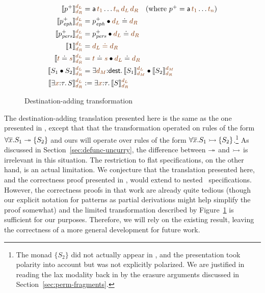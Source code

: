 \begin{figure}
\begin{align*}
\llbracket p^+ \rrbracket^{\lf{d_L}}_{\lf{d_R}} & = 
 {\sf a}\,\lf{t_1}\ldots \lf{t_n}\,\lf{d_L}\,\lf{d_R} ~~~ \mbox{(where $p^+ = {\sf a}\,\lf{t_1}\ldots \lf{t_n}$)}
\\
\llbracket p^+_\meph \rrbracket^{\lf{d_L}}_{\lf{d_R}} & = p^+_\meph \fuse \lf{d_L} \doteq \lf{d_R}
\\
\llbracket p^+_\mpers \rrbracket^{\lf{d_L}}_{\lf{d_R}} & = p^+_\mpers \fuse \lf{d_L} \doteq \lf{d_R}
\\
\llbracket \one \rrbracket^{\lf{d_L}}_{\lf{d_R}} & = \lf{d_L \doteq d_R}
\\
\llbracket \lf t \doteq \lf s \rrbracket^{\lf{d_L}}_{\lf{d_R}} & = \lf{t} \doteq \lf{s} \fuse \lf{d_L} \doteq \lf{d_R}
\\
\llbracket S_1 \fuse S_2 \rrbracket^{\lf{d_L}}_{\lf{d_R}} & = 
 \exists \lf{d_M}{:}{\sf dest}.\, 
   \llbracket S_1 \rrbracket^{\lf{d_L}}_{\lf{d_M}}
   \fuse
   \llbracket S_2 \rrbracket^{\lf{d_M}}_{\lf{d_R}}
\\
\llbracket \exists \lf{x}{:}\tau.\,S \rrbracket^{\lf{d_L}}_{\lf{d_R}} & := 
 \exists \lf{x}{:}\tau.\, \llbracket S \rrbracket^{\lf{d_L}}_{\lf{d_R}}
\end{align*}
\caption{Destination-adding transformation}
\label{fig:destadd-pos}
\end{figure}


The destination-adding translation presented here is the same as the
one presented in \cite{simmons11logical}, except that that the
transformation operated on rules of the form $\forall
\overline{x}. S_1 \twoheadrightarrow \{ S_2 \}$ and ours will operate over rules
of the form $\forall \overline{x}. S_1 \rightarrowtail \{ S_2 \}$.\footnote{The
  monad $\{ S_2 \}$ did not actually appear in
  \cite{simmons11logical}, and the presentation took polarity into
  account but was not explicitly polarized. We are justified in
  reading the lax modality back in by the erasure arguments discussed
  in Section~\ref{sec:perm-fragments}.} As discussed in
Section~\ref{sec:defunc-uncurry}, the difference between $\twoheadrightarrow$ and
$\rightarrowtail$ is irrelevant in this situation. The restriction to flat
specifications, on the other hand, is an actual limitation. We
conjecture that the translation presented here, and the correctness
proof presented in \cite{simmons11logical}, would extend to nested
\sls~specifications. However, the correctness proofs in that work are
already quite tedious (though our explicit notation for patterns as
partial derivations might help simplify the proof somewhat) and the
limited transformation described by Figure~\ref{fig:destadd-pos}
 is sufficient for our purposes. Therefore, we
will rely on the existing result, leaving the correctness of a more
general development for future work.

